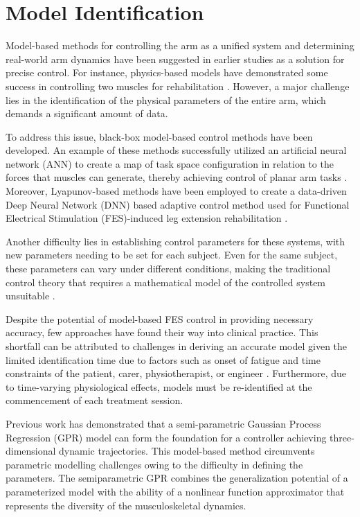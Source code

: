 \newpage
\section{Model Identification}

Model-based methods for controlling the arm as a unified system and determining real-world arm dynamics have been suggested in earlier studies as a solution for precise control. For instance, physics-based models have demonstrated some success in controlling two muscles for rehabilitation \cite{IOL}. However, a major challenge lies in the identification of the physical parameters of the entire arm, which demands a significant amount of data.

To address this issue, black-box model-based control methods have been developed. An example of these methods successfully utilized an artificial neural network (ANN) to create a map of task space configuration in relation to the forces that muscles can generate, thereby achieving control of planar arm tasks \cite{FC2D}. Moreover, Lyapunov-based methods have been employed to create a data-driven Deep Neural Network (DNN) based adaptive control method used for Functional Electrical Stimulation (FES)-induced leg extension rehabilitation \cite{CLDNN}.

Another difficulty lies in establishing control parameters for these systems, with new parameters needing to be set for each subject. Even for the same subject, these parameters can vary under different conditions, making the traditional control theory that requires a mathematical model of the controlled system unsuitable \cite{NNPID}. 

Despite the potential of model-based FES control in providing necessary accuracy, few approaches have found their way into clinical practice. This shortfall can be attributed to challenges in deriving an accurate model given the limited identification time due to factors such as onset of fatigue and time constraints of the patient, carer, physiotherapist, or engineer \cite{IOL}. Furthermore, due to time-varying physiological effects, models must be re-identified at the commencement of each treatment session.

Previous work has demonstrated that a semi-parametric Gaussian Process Regression (GPR) model can form the foundation for a controller achieving three-dimensional dynamic trajectories. This model-based method \cite{QSC} circumvents parametric modelling challenges owing to the difficulty in defining the parameters. The semiparametric GPR combines the generalization potential of a parameterized model with the ability of a nonlinear function approximator that represents the diversity of the musculoskeletal dynamics. 

